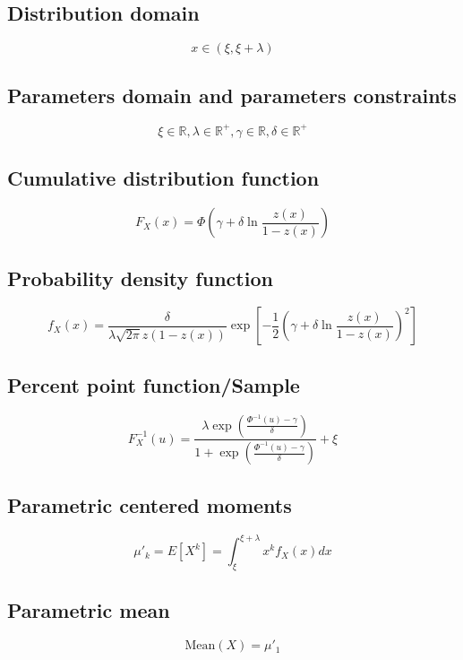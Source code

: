 \documentclass{article}
\begin{document}
\subsection{Distribution domain}
\begin{equation*} x\in\left(\xi,\xi+\lambda\right) \end{equation*}
\subsection{Parameters domain and parameters constraints}
\begin{equation*} \xi\in\mathbb{R}, \lambda\in\mathbb{R}^{+}, \gamma\in\mathbb{R}, \delta\in\mathbb{R}^{+} \end{equation*}
\subsection{Cumulative distribution function}
\begin{equation*} F_{X}\left(x\right)=\Phi\left(\gamma+\delta\ln\frac{z(x)}{1-z(x)}\right) \end{equation*}
\subsection{Probability density function}
\begin{equation*} f_{X}\left(x\right)=\frac{\delta}{\lambda\sqrt{2\pi}z(1-z(x))}\exp\left[-\frac{1}{2}\left(\gamma+\delta\ln\frac{z(x)}{1-z(x)}\right)^2\right] \end{equation*}
\subsection{Percent point function/Sample}
\begin{equation*} F^{-1}_{X}\left(u\right)=\frac{\lambda\exp\left(\frac{\Phi^{-1}(u)-\gamma}{\delta}\right)}{1+\exp\left(\frac{\Phi^{-1}(u)-\gamma}{\delta}\right)}+\xi \end{equation*}
\subsection{Parametric centered moments}
\begin{equation*} \mu'_{k}=E[X^k]=\int_{\xi}^{\xi+\lambda }x^{k}f_{X}\left(x\right)dx \end{equation*}
\subsection{Parametric mean}
\begin{equation*} \mathrm{Mean}(X)=\mu'_{1} \end{equation*}
\end{document}
